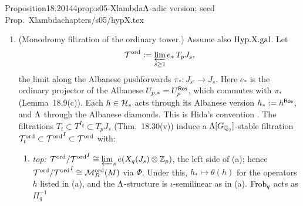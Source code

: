 \begin{quoted}{Proposition}{18.20}{144}{prop:s05-Xlambda}{$\Lambda$-adic version; seed Prop.~Xlambda}{chapters/s05/hypX.tex}
\begin{enumerate}[label=(\alph*)]
\begin{enumerate}[label=(c\arabic*)]
    (which modules, which constant) is item (vi) of Remark~18.22, which lists the missing steps (i)--(vi). Nothing in this chapter
    uses (c2) as proved.
  \end{enumerate}
\item (Monodromy filtration of the ordinary tower.) Assume also $\mathrm{Hyp.X.gal}$. Let
  \[\mathcal{T}^{\mathrm{ord}}:=\varprojlim_{s\ge1}e_*\,T_pJ_s,\]
  the limit along the Albanese pushforwards $\pi_*:J_{s'}\to J_s$. Here $e_*$ is the ordinary projector of the Albanese $U_{p,*}=U_p^{\mathsf{Ros}}$, which commutes
  with $\pi_*$ (Lemma~18.9(c)). Each $h\in\mathcal{H}_s$ acts through its Albanese version $h_*:=h^{\mathsf{Ros}}$, and $\Lambda$ through the Albanese diamonds.
  This is Hida's convention
  \cite[{\S8, pp.~595--596: $J_r$ viewed as
  $\mathrm{Alb}(X_r)$, covariant Hecke action, limit along the covariant maps, $e$ attached to $T(p)$}]{Hi86a}.
  The filtrations $T_t\subset T^{I_q}\subset T_pJ_s$ (Thm.~18.30(v)) induce a $\Lambda[G_{\mathbb{Q}_q}]$-stable filtration
  $\mathcal{T}^{\mathrm{ord}}_t\subset{\mathcal{T}^{\mathrm{ord}}}^{I}\subset\mathcal{T}^{\mathrm{ord}}$ with:
  \begin{enumerate}[label=(d\arabic*)]
  \item \emph{top:} $\mathcal{T}^{\mathrm{ord}}/{\mathcal{T}^{\mathrm{ord}}}^{I}\cong\varprojlim_se(X_q(J_s)\otimes\mathbb{Z}_p)$, the left side of (a); hence $\mathcal{T}^{\mathrm{ord}}/{\mathcal{T}^{\mathrm{ord}}}^I\cong\mathcal{M}^{\mathrm{ord}}_B(M)$ via $\Phi$.
    Under this, $h_*\mapsto\theta(h)$ for the operators $h$ listed in (a), and the $\Lambda$-structure is $\iota$-semilinear as in (a). $\mathrm{Frob}_q$ acts as $\Pi_q^{-1}$

\end{enumerate}
\end{enumerate}
\end{quoted}
